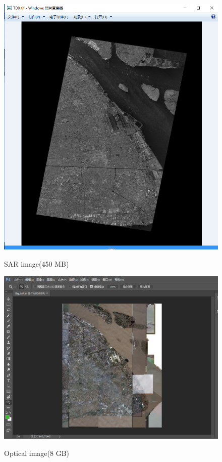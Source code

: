 \documentclass[]{IEEEtran}
\begin{document}
\begin{figure}[!hbt]
		\vspace{0.3cm}
		\begin{center}
			\includegraphics[width=\columnwidth]{sar}
			\caption{SAR image(450 MB)}
			\label{fig:mp}
		    \hspace{0.5cm}
			\includegraphics[width=\columnwidth]{opt}
			\caption{Optical image(8 GB)}
			\label{fig:ss}
		\end{center}
	\end{figure}
\end{document}
